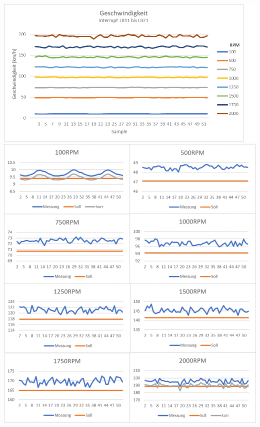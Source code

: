 \includegraphics[width=\textwidth]{images/auswertungSpeedUeb.png}\\
\includegraphics[width=\textwidth]{images/auswertungSpeed.png}\\
